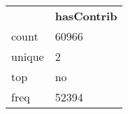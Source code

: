 \begin{tabular}{ll}
 & \textbf{hasContrib} \\
count & 60966 \\
unique & 2 \\
top & no \\
freq & 52394 \\
\end{tabular}
